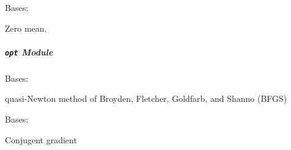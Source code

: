 \documentclass[letterpaper,10pt,english]{sphinxmanual}
\begin{document}
\begin{fulllineitems}
\label{pyGPs.Core:pyGPs.Core.mean.Zero}
Bases: {\hyperref[pyGPs.Core:pyGPs.Core.mean.Mean]{}}

Zero mean.

\begin{fulllineitems}
\label{pyGPs.Core:pyGPs.Core.mean.Zero.getDerMatrix}
\end{fulllineitems}


\begin{fulllineitems}
\label{pyGPs.Core:pyGPs.Core.mean.Zero.getMean}
\end{fulllineitems}


\end{fulllineitems}



\subparagraph{\texttt{opt} Module}
\label{pyGPs.Core:opt-module}\label{pyGPs.Core:module-pyGPs.Core.opt}

\begin{fulllineitems}
\label{pyGPs.Core:pyGPs.Core.opt.BFGS}
Bases: {\hyperref[pyGPs.Core:pyGPs.Core.opt.Optimizer]{}}

quasi-Newton method of Broyden, Fletcher, Goldfarb, and Shanno (BFGS)

\begin{fulllineitems}
\label{pyGPs.Core:pyGPs.Core.opt.BFGS.findMin}
\end{fulllineitems}


\end{fulllineitems}


\begin{fulllineitems}
\label{pyGPs.Core:pyGPs.Core.opt.CG}
Bases: {\hyperref[pyGPs.Core:pyGPs.Core.opt.Optimizer]{}}

Conjugent gradient

\begin{fulllineitems}
\label{pyGPs.Core:pyGPs.Core.opt.CG.findMin}
\end{fulllineitems}


\end{fulllineitems}
\end{document}
